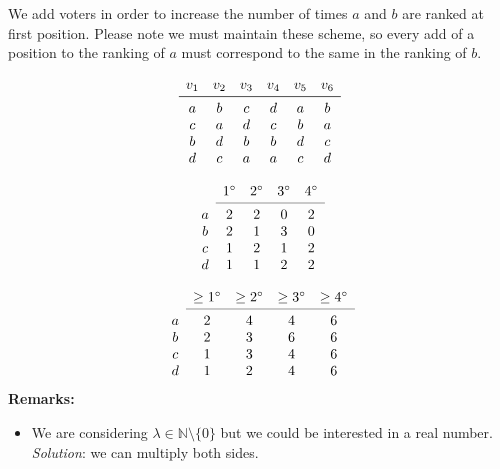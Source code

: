 \documentclass[12pt]{article}
\begin{document}
We add voters in order to increase the number of times $a$ and $b$ are ranked at first position. Please note we must maintain these scheme, so every add of a position to the ranking of $a$ must correspond to the same in the ranking of $b$.

\[
\begin{array}{cccccc}
v_1
& v_2
& v_3 
& v_4
& v_5
& v_6 \\
\midrule 
a
& b
& c 
& d
& a
& b \\
c
& a
& d
& c
& b
& a \\
b
& d
& b
& b
& d
& c \\
d
& c
& a
& a
& c
& d \\
\end{array}
\]

\[
\begin{array}{ccccc}
& 1^\circ
& 2^\circ
& 3^\circ
& 4^\circ \\
\cmidrule{2-5}
a 
& 2
& 2
& 0
& 2 \\
b
& 2
& 1
& 3
& 0 \\
c
& 1
& 2
& 1
& 2 \\
d
& 1
& 1
& 2
& 2 \\
\end{array}
\]

\[
\begin{array}{ccccc}
& \geq 1^\circ
& \geq 2^\circ
& \geq 3^\circ
& \geq 4^\circ \\
\cmidrule{2-5}
a 
& 2
& 4
& 4
& 6 \\
b
& 2
& 3
& 6
& 6 \\
c
& 1
& 3
& 4
& 6 \\
d
& 1
& 2
& 4
& 6 \\
\end{array}
\]
\textbf{Remarks:}
\begin{itemize}
	\item We are considering $\lambda \in \mathbb{N} \setminus \{0\}$ but we could be interested in a real number. \textit{Solution}: we can multiply both sides.
\end{itemize}
\end{document}
